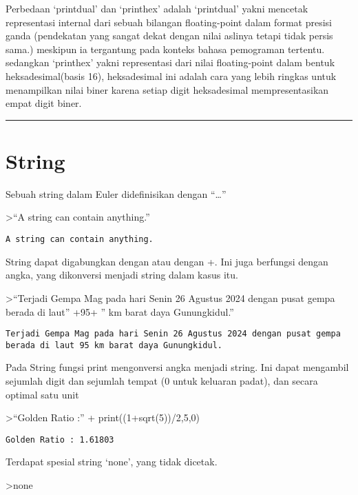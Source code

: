 \documentclass[
]{book}
\begin{document}
Perbedaan `printdual' dan `printhex' adalah `printdual' yakni mencetak representasi internal dari sebuah bilangan floating-point dalam format presisi ganda (pendekatan yang sangat dekat dengan nilai aslinya tetapi tidak persis sama.) meskipun ia tergantung pada konteks bahasa pemograman tertentu. sedangkan `printhex' yakni representasi dari nilai floating-point dalam bentuk heksadesimal(basis 16), heksadesimal ini adalah cara yang lebih ringkas untuk menampilkan nilai biner karena setiap digit heksadesimal mempresentasikan empat digit biner.

\begin{center}\rule{0.5\linewidth}{0.5pt}\end{center}

\section{String}\label{string}

Sebuah string dalam Euler didefinisikan dengan ``\ldots{}''

\textgreater{}``A string can contain anything.''

\begin{verbatim}
A string can contain anything.
\end{verbatim}

String dapat digabungkan dengan \textbar{} atau dengan +. Ini juga berfungsi dengan angka, yang dikonversi menjadi string dalam kasus itu.

\textgreater{}``Terjadi Gempa Mag pada hari Senin 26 Agustus 2024 dengan pusat gempa berada di laut'' +95+ '' km barat daya Gunungkidul.''

\begin{verbatim}
Terjadi Gempa Mag pada hari Senin 26 Agustus 2024 dengan pusat gempa berada di laut 95 km barat daya Gunungkidul.
\end{verbatim}

Pada String fungsi print mengonversi angka menjadi string. Ini dapat mengambil sejumlah digit dan sejumlah tempat (0 untuk keluaran padat), dan secara optimal satu unit

\textgreater{}``Golden Ratio :'' + print((1+sqrt(5))/2,5,0)

\begin{verbatim}
Golden Ratio : 1.61803
\end{verbatim}

Terdapat spesial string `none', yang tidak dicetak.

\textgreater none
\end{document}
